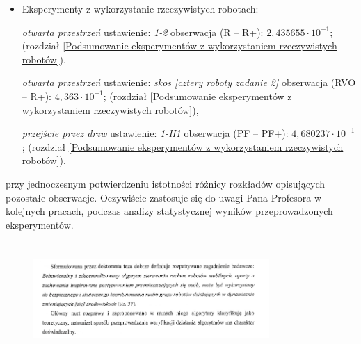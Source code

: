 \begin{frame}
{\begin{itemize}
	\subitem \textit{otwarta przestrzeń okrąg} ustawienie: \textit{dwanaście robotów}, obserwacja (RVO -- R+): $3,36788 \cdot 10^{-1}$; (rozdział \ref{Wyniki_Otwarta_przestrzen_prostopadle_Ustawienie w okrąg}),
	
	\subitem \textit{przejście przez drzwi} ustawienia: \textit{1-H1} obserwacja (R -- PF): $0,5$; (rozdział \ref{Podsumowanie_eksperymenty_symulacyjne}),
	
	\subitem \textit{przejście przez drzwi} ustawienia: \textit{H1-4} obserwacja (R+ -- PF+): $4,43920 \cdot 10^{-1}$; (rozdział \ref{Wyniki_Przejscie_przez_drzwi}),
	
	\subitem \textit{przejście przez drzwi} ustawienie: \textit{H9-8} obserwacja (R+ -- PF+): $8,60042 \cdot 10^{-2}$; (rozdział \ref{Wyniki_Przejscie_przez_drzwi}),
	
	\subitem \textit{Skrzyżowanie typu 8} ustawienie: \textit{cztery roboty} obserwacja (R -- R+): $3,035915 \cdot 10^{-1}$; (rozdział \ref{Podsumowanie_eksperymenty_symulacyjne}), 
	
	
	\item Eksperymenty z wykorzystanie rzeczywistych robotach:
	
	\subitem \textit{otwarta przestrzeń} ustawienie: \textit{1-2} obserwacja (R -- R+): $2,435655 \cdot 10^{-1}$; (rozdział \ref{Podsumowanie eksperymentów z wykorzystaniem rzeczywistych robotów}), 
	
	\subitem \textit{otwarta przestrzeń} ustawienie: \textit{skos [cztery roboty zadanie 2]} obserwacja (RVO -- R+): $4,363 \cdot 10^{-1}$; (rozdział \ref{Podsumowanie eksperymentów z wykorzystaniem rzeczywistych robotów}), 	
	
	\subitem \textit{przejście przez drzw} ustawienie: \textit{1-H1} obserwacja (PF -- PF+): $4,680237 \cdot 10^{-1}$; (rozdział \ref{Podsumowanie eksperymentów z wykorzystaniem rzeczywistych robotów}).	
\end{itemize}

przy jednoczesnym potwierdzeniu istotności różnicy rozkładów opisujących pozostałe obserwacje.
Oczywiście zastosuje się do uwagi Pana Profesora w kolejnych pracach, podczas analizy statystycznej wyników przeprowadzonych eksperymentów. 

}
\end{frame}


\section*{}
\begin{frame}
\frametitle{\secname}
\begin{figure}[!ht]
	\centering
	\includegraphics[page=4, width=0.8\textwidth]{img/ReviewZubert.pdf}	
\end{figure}
\end{frame}

